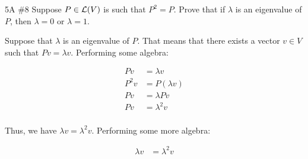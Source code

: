 \documentclass[../main.tex]{subfiles}
\begin{document}
\begin{problem}{5A \#8}
  Suppose $P \in \mathcal{L}(V)$ is such that $P^2 = P$. Prove that if $\lambda$ is an
  eigenvalue of $P$, then $\lambda = 0$ or $\lambda = 1$.
\end{problem}

\begin{solution}
  Suppose that $\lambda$ is an eigenvalue of $P$. That means that there exists
  a vector $v \in V$ such that $Pv = \lambda v$. Performing some algebra:

  \[
    \begin{aligned}
      Pv   & = \lambda v    \\
      P^2v & = P(\lambda v) \\
      Pv   & = \lambda Pv   \\
      Pv   & = \lambda^2v   \\
    \end{aligned}
  \]

  Thus, we have $\lambda v = \lambda^2v$. Performing some more algebra:

  \[
    \begin{aligned}
      \lambda v & = \lambda^2v \\
    \end{aligned}
  \]
\end{solution}
\end{document}

